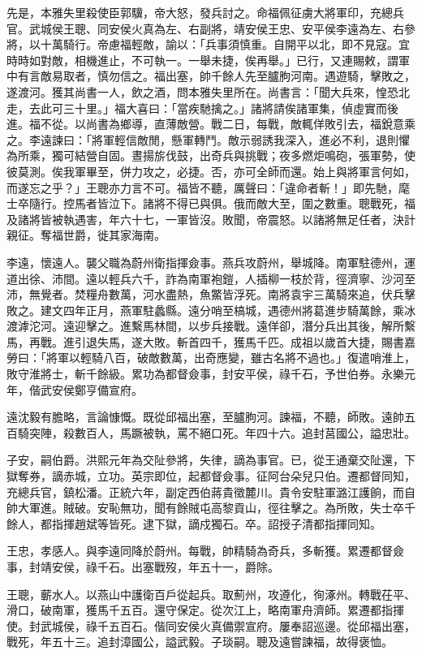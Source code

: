 \begin{pinyinscope}
先是，本雅失里殺使臣郭驥，帝大怒，發兵討之。命福佩征虜大將軍印，充總兵官。武城侯王聰、同安侯火真為左、右副將，靖安侯王忠、安平侯李遠為左、右參將，以十萬騎行。帝慮福輕敵，諭以：「兵事須慎重。自開平以北，即不見寇。宜時時如對敵，相機進止，不可執一。一舉未捷，俟再舉。」已行，又連賜敕，謂軍中有言敵易取者，慎勿信之。福出塞，帥千餘人先至臚朐河南。遇遊騎，擊敗之，遂渡河。獲其尚書一人，飲之酒，問本雅失里所在。尚書言：「聞大兵來，惶恐北走，去此可三十里。」福大喜曰：「當疾馳擒之。」諸將請俟諸軍集，偵虛實而後進。福不從。以尚書為鄉導，直薄敵營。戰二日，每戰，敵輒佯敗引去，福銳意乘之。李遠諫曰：「將軍輕信敵閒，懸軍轉鬥。敵示弱誘我深入，進必不利，退則懼為所乘，獨可結營自固。晝揚旂伐鼓，出奇兵與挑戰；夜多燃炬鳴砲，張軍勢，使彼莫測。俟我軍畢至，併力攻之，必捷。否，亦可全師而還。始上與將軍言何如，而遂忘之乎？」王聰亦力言不可。福皆不聽，厲聲曰：「違命者斬！」即先馳，麾士卒隨行。控馬者皆泣下。諸將不得已與俱。俄而敵大至，圍之數重。聰戰死，福及諸將皆被執遇害，年六十七，一軍皆沒。敗聞，帝震怒。以諸將無足任者，決計親征。奪福世爵，徙其家海南。

李遠，懷遠人。襲父職為蔚州衛指揮僉事。燕兵攻蔚州，舉城降。南軍駐德州，運道出徐、沛間。遠以輕兵六千，詐為南軍袍鎧，人插柳一枝於背，徑濟寧、沙河至沛，無覺者。焚糧舟數萬，河水盡熱，魚鱉皆浮死。南將袁宇三萬騎來追，伏兵擊敗之。建文四年正月，燕軍駐蠡縣。遠分哨至槁城，遇德州將葛進步騎萬餘，乘冰渡滹沱河。遠迎擊之。進繫馬林間，以步兵接戰。遠佯卻，潛分兵出其後，解所繫馬，再戰。進引退失馬，遂大敗。斬首四千，獲馬千匹。成祖以歲首大捷，賜書嘉勞曰：「將軍以輕騎八百，破敵數萬，出奇應變，雖古名將不過也。」復遣哨淮上，敗守淮將士，斬千餘級。累功為都督僉事，封安平侯，祿千石，予世伯券。永樂元年，偕武安侯鄭亨備宣府。

遠沈毅有膽略，言論慷慨。既從邱福出塞，至臚朐河。諫福，不聽，師敗。遠帥五百騎突陣，殺數百人，馬蹶被執，罵不絕口死。年四十六。追封莒國公，謚忠壯。

子安，嗣伯爵。洪熙元年為交阯參將，失律，謫為事官。已，從王通棄交阯還，下獄奪券，謫赤城，立功。英宗即位，起都督僉事。征阿台朵兒只伯。遷都督同知，充總兵官，鎮松潘。正統六年，副定西伯蔣貴徵麓川。貴令安駐軍潞江護餉，而自帥大軍進。賊破。安恥無功，聞有餘賊屯高黎貢山，徑往擊之。為所敗，失士卒千餘人，都指揮趙斌等皆死。逮下獄，謫戍獨石。卒。詔授子清都指揮同知。

王忠，孝感人。與李遠同降於蔚州。每戰，帥精騎為奇兵，多斬獲。累遷都督僉事，封靖安侯，祿千石。出塞戰歿，年五十一，爵除。

王聰，蘄水人。以燕山中護衛百戶從起兵。取薊州，攻遵化，徇涿州。轉戰茌平、滑口，破南軍，獲馬千五百。還守保定。從次江上，略南軍舟濟師。累遷都指揮使。封武城侯，祿千五百石。偕同安侯火真備禦宣府。屢奉詔巡邊。從邱福出塞，戰死，年五十三。追封漳國公，謚武毅。子琰嗣。聰及遠嘗諫福，故得褒恤。


\end{pinyinscope}
